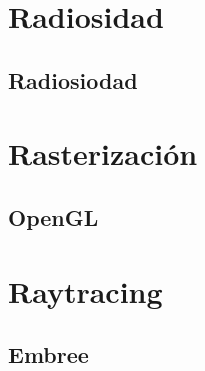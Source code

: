 \section{Radiosidad}
\label{sec:radiosidad}

\subsection{Radiosiodad}

\section{Rasterización}
\label{sec:rasterizacion}

\subsection{OpenGL}
\label{sec:opengl}

\section{Raytracing}
\label{sec:raytracing}

\subsection{Embree}
\label{sec:embree}
